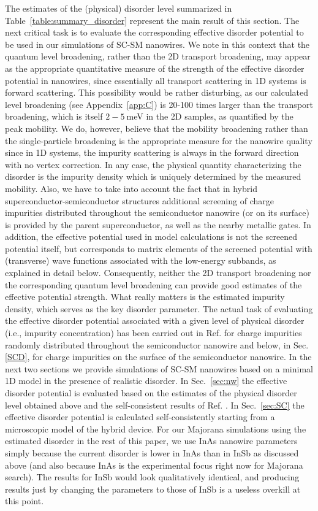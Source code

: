 \documentclass[aps,prmaterials,twocolumn,superscriptaddress,longbibliography]{revtex4-2}
\begin{document}
The estimates of the (physical) disorder level summarized in Table~\ref{table:summary_disorder} represent the main result of this section. The next critical task is to evaluate the corresponding effective disorder potential to be used in our simulations of SC-SM nanowires.  
We note in this context that the quantum level broadening, rather than the 2D transport broadening,  may appear as the appropriate quantitative measure of the strength of the effective disorder potential in nanowires, since essentially all transport scattering in 1D systems is forward scattering. This possibility would be rather disturbing, as our calculated level broadening (see Appendix~\ref{app:C}) is 20-100 times larger than the transport broadening, which is itself $2-5~$meV in the 2D samples, as quantified by the peak mobility. We do, however, believe that the mobility broadening rather than the single-particle broadening is the appropriate measure for the nanowire quality since in 1D systems, the impurity scattering is always in the forward direction with no vertex correction.  In any case, the physical quantity characterizing the disorder is the impurity density which is uniquely determined by the measured mobility. Also, we have to take into account the fact that in hybrid superconductor-semiconductor structures additional screening of charge impurities distributed throughout the semiconductor nanowire (or on its surface)  is provided by the parent superconductor, as well as the nearby metallic gates. In addition, the effective potential used in model calculations is not the screened potential itself,  but corresponds to matrix elements of the screened potential with (transverse) wave functions associated with the low-energy subbands, as explained in detail below. Consequently, neither the 2D transport broadening nor the corresponding quantum level broadening can provide good estimates of the effective potential strength. What really matters is the estimated impurity density, which serves as the key disorder parameter. The actual task of evaluating the effective disorder potential associated with a given level of physical disorder (i.e., impurity concentration) has been carried out in Ref.  for charge impurities randomly distributed throughout the semiconductor nanowire and below, in Sec. \ref{SCD}, for charge impurities on the surface of the semiconductor nanowire. 
In the next two sections we provide simulations of SC-SM nanowires based on a minimal 1D model in the presence of realistic disorder. In  Sec.~\ref{sec:nw} the effective disorder potential is evaluated based on the estimates of the physical disorder level obtained above and the self-consistent results of  Ref. . In Sec.~\ref{sec:SC} the effective disorder potential is calculated self-consistently starting from a microscopic model of the hybrid device. For our Majorana simulations using the estimated disorder in the rest of this paper, we use InAs nanowire parameters simply because the current disorder is lower in InAs than in InSb as discussed above (and also because InAs is the experimental focus right now for Majorana search).  The results for InSb would look qualitatively identical, and producing results just by changing the parameters to those of InSb is a useless overkill at this point.
\end{document}
